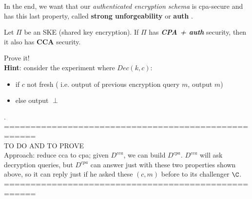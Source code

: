 In the end, we want that our \textit{authenticated encryption schema} is
cpa-secure and has this last property, called \textbf{strong unforgeability} or
\textbf{auth} . 

\begin{theorem}
    Let $\Pi$ be an SKE (shared key encryption). If $\Pi$ has \textbf{
    \textit{CPA + auth} } security, then it also has \textbf{CCA} security.
\end{theorem}

\begin{exercise}
    Prove it!\\
    \textbf{Hint}: consider the experiment where $Dec(k, c)$:
    \begin{itemize}
        \item if $c$ not fresh ( i.e. output of previous encryption query $m$,
            output $m$)
        \item else output $\perp$
    \end{itemize}
    .
    ====================================================\\
    TO DO AND TO PROVE\\
    Approach: reduce cca to cpa; given $D^{cca}$, we can build $D^{cpa}$.
    $D^{cca}$ will ask decryption queries, but $D^{cpa}$ can answer just with
    these two properties shown above, so it can reply just if he asked these
    $(c, m)$ before to its challenger $\C$.
    ====================================================\\
\end{exercise}

